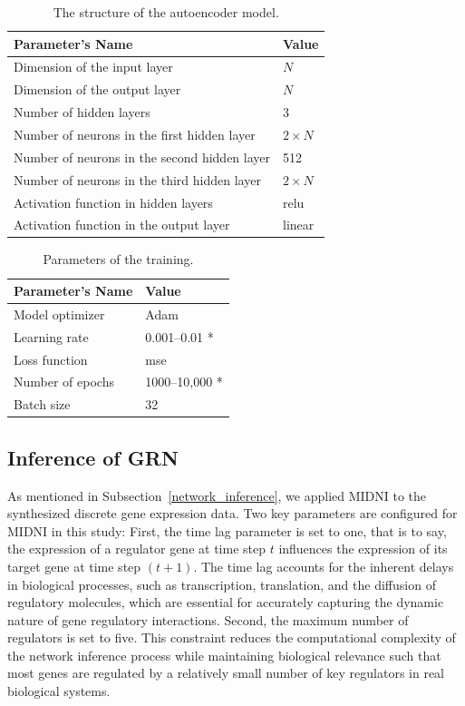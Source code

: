 \begin{table}[th] 
\caption{The structure of the autoencoder model.\label{structure_autoencoder}}
\begin{tabular}{@{}p{} p{}@{}} 
\toprule
\textbf{Parameter's Name}	& \textbf{Value}\\
\midrule
Dimension of the input layer & \(N\)\\
Dimension of the output layer & \(N\)\\
Number of hidden layers & 3\\
Number of neurons in the first hidden layer & \(2 \times 
 N\)\\
Number of neurons in the second hidden layer & 512\\
Number of neurons in the third hidden layer & \(2 \times N\)\\
Activation function in hidden layers & relu\\
Activation function in the output layer & linear\\
\bottomrule
\end{tabular}
\end{table}

\vspace{-10pt}
\begin{table}[th] 
\caption{Parameters of the training.\label{training_parameter}}
\begin{tabular}{@{}p{} p{}@{}} 
\toprule
\textbf{Parameter's Name}	& \textbf{Value}\\
\midrule
Model optimizer		& Adam	\\
Learning rate & 0.001--0.01 *\\
Loss function & mse\\
Number of epochs & 1000--10,000 *\\
Batch size & 32\\
\bottomrule
\end{tabular}
\end{table}

\subsection{Inference of GRN}
As mentioned in Subsection~\ref{network_inference}, we applied MIDNI to the synthesized discrete gene expression data. Two key parameters are configured for MIDNI in this study: First, the time lag parameter is set to one, that is to say, the expression of a regulator gene at time step \(t\) influences the expression of its target gene at time step \((t + 1)\). The time lag accounts for the inherent delays in biological processes, such as transcription, translation, and the diffusion of regulatory molecules, which are essential for accurately capturing the dynamic nature of gene regulatory interactions. Second, the maximum number of regulators is set to five. This constraint reduces the computational complexity of the network inference process while maintaining biological relevance such that most genes are regulated by a relatively small number of key regulators in real biological systems.

